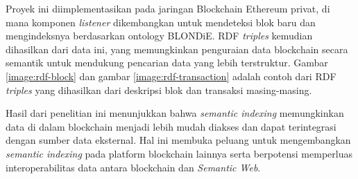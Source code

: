 Proyek ini diimplementasikan pada jaringan Blockchain Ethereum privat, di mana komponen \textit{listener} dikembangkan untuk mendeteksi blok baru dan mengindeksnya berdasarkan ontology BLONDiE. RDF \textit{triples} kemudian dihasilkan dari data ini, yang memungkinkan penguraian data blockchain secara semantik untuk mendukung pencarian data yang lebih terstruktur. Gambar \ref{image:rdf-block} dan gambar \ref{image:rdf-transaction} adalah contoh dari RDF \textit{triples} yang dihasilkan dari deskripsi blok dan transaksi masing-masing.

Hasil dari penelitian ini menunjukkan bahwa \textit{semantic indexing} memungkinkan data di dalam blockchain menjadi lebih mudah diakses dan dapat terintegrasi dengan sumber data eksternal. Hal ini membuka peluang untuk mengembangkan \textit{semantic indexing} pada platform blockchain lainnya serta berpotensi memperluas interoperabilitas data antara blockchain dan \textit{Semantic Web}.